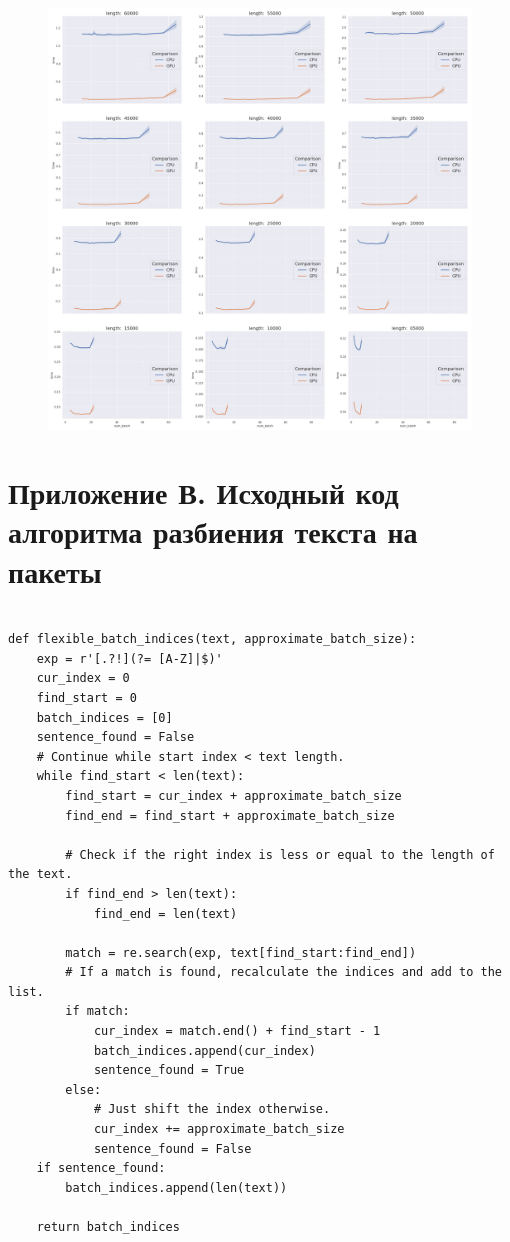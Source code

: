 \begin{figure}[h]
\centering
\includegraphics[width=\textwidth]{img/num_CPU_vs_GPU_Grid}
\end{figure}

\newpage
\section*{Приложение В. Исходный код  алгоритма разбиения текста на  пакеты}
\label{sec:code}

\begin{ListingEnv}[h]
\begin{lstlisting}

def flexible_batch_indices(text, approximate_batch_size):
    exp = r'[.?!](?= [A-Z]|$)'
    cur_index = 0
    find_start = 0
    batch_indices = [0]
    sentence_found = False
    # Continue while start index < text length.
    while find_start < len(text):
        find_start = cur_index + approximate_batch_size
        find_end = find_start + approximate_batch_size

        # Check if the right index is less or equal to the length of the text.
        if find_end > len(text):
            find_end = len(text)
     
        match = re.search(exp, text[find_start:find_end])
        # If a match is found, recalculate the indices and add to the list.
        if match:
            cur_index = match.end() + find_start - 1
            batch_indices.append(cur_index)
            sentence_found = True
        else:
            # Just shift the index otherwise.
            cur_index += approximate_batch_size
            sentence_found = False
    if sentence_found:
        batch_indices.append(len(text))
        
    return batch_indices
\end{lstlisting}
\end{ListingEnv}





